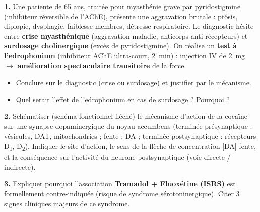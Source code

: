 \documentclass[11pt]{article}
\begin{document}
\begin{exercice}
\textbf{1.} Une patiente de 65 ans, traitée pour myasthénie grave par pyridostigmine (inhibiteur réversible de l'AChE), présente une aggravation brutale : ptôsis, diplopie, dysphagie, faiblesse membres, détresse respiratoire. Le diagnostic hésite entre \textbf{crise myasthénique} (aggravation maladie, anticorps anti-récepteurs) et \textbf{surdosage cholinergique} (excès de pyridostigmine). On réalise un \textbf{test à l'edrophonium} (inhibiteur AChE ultra-court, \SI{2}{\minute}) : injection IV de \SI{2}{\milli\gram} $\rightarrow$ \textbf{amélioration spectaculaire transitoire} de la force.
\begin{itemize}
    \item[a)] Conclure sur le diagnostic (crise ou surdosage) et justifier par le mécanisme.
    \item[b)] Quel serait l'effet de l'edrophonium en cas de surdosage ? Pourquoi ?
\end{itemize}

\textbf{2.} Schématiser (schéma fonctionnel fléché) le mécanisme d'action de la cocaïne sur une synapse dopaminergique du noyau accumbens (terminée présynaptique : vésicules, DAT, mitochondries ; fente : DA ; terminée postsynaptique : récepteurs D\textsubscript{1}, D\textsubscript{2}). Indiquer le site d'action, le sens de la flèche de concentration [DA] fente, et la conséquence sur l'activité du neurone postsynaptique (voie directe / indirecte).

\textbf{3.} Expliquer pourquoi l'association \textbf{Tramadol + Fluoxétine (ISRS)} est formellement contre-indiquée (risque de syndrome sérotoninergique). Citer 3 signes cliniques majeurs de ce syndrome.
\end{exercice}
\end{document}
